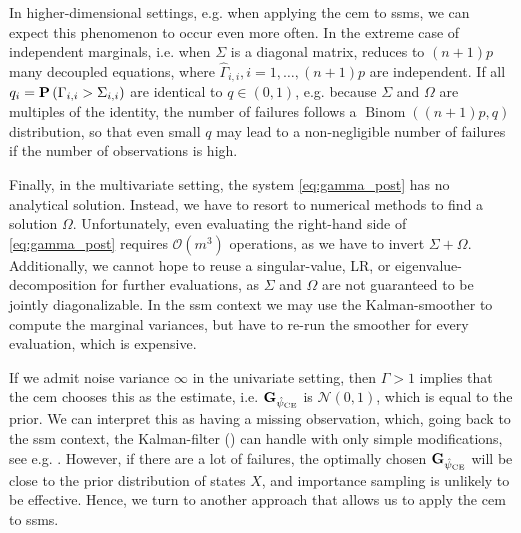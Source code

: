 
In higher-dimensional settings, e.g. when applying the \gls{cem} to \glspl{ssm}, we can expect this phenomenon to occur even more often. In the extreme case of independent marginals, i.e. when $\Sigma$ is a diagonal matrix,  reduces to $(n + 1)p$ many decoupled equations, where $\hat \Gamma_{i,i}, i =1, \dots, (n + 1)p$ are independent. If all $q_{i} = \P \left(\Gamma_{i,i} > \Sigma_{i,i}\right)$ are identical to $q \in (0, 1)$, e.g. because $\Sigma$ and $\Omega$ are multiples of the identity, the number of failures follows a $\operatorname{Binom} \left( (n + 1)p, q \right)$ distribution, so that even small $q$ may lead to a non-negligible number of failures if the number of observations is high. 

Finally, in the multivariate setting, the system \eqref{eq:gamma_post} has no analytical solution. Instead, we have to resort to numerical methods to find a solution $\Omega$. Unfortunately, even evaluating the right-hand side of \eqref{eq:gamma_post} requires $\mathcal O(m^3)$ operations, as we have to invert $\Sigma + \Omega$. Additionally, we cannot hope to reuse a singular-value, LR, or eigenvalue-decomposition for further evaluations, as $\Sigma$ and $\Omega$ are not guaranteed to be jointly diagonalizable.
In the \gls{ssm} context we may use the Kalman-smoother to compute the marginal variances, but have to re-run the smoother for every evaluation, which is expensive. 

If we admit noise variance $\infty$ in the univariate setting, then $\Gamma > 1$ implies that the \gls{cem} chooses this as the estimate, i.e. $\G_{\hpce}$ is $\mathcal N(0, 1)$, which is equal to the prior. We can interpret this as having a missing observation, which, going back to the \gls{ssm} context, the Kalman-filter () can handle with only simple modifications, see e.g. \citep[Section 4.10]{Durbin2012Time}. However, if there are a lot of failures, the optimally chosen $\G_{\hpce}$ will be close to the prior distribution of states $X$, and importance sampling is unlikely to be effective. Hence, we turn to another approach that allows us to apply the \gls{cem} to \glspl{ssm}.

